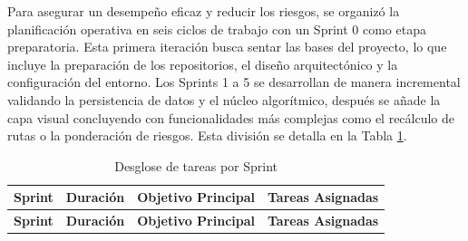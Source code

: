 Para asegurar un desempeño eficaz y reducir los riesgos, se organizó la planificación operativa en seis ciclos de trabajo con un Sprint 0 como etapa preparatoria. Esta primera iteración busca sentar las bases del proyecto, lo que incluye la preparación de los repositorios, el diseño arquitectónico y la configuración del entorno. Los Sprints 1 a 5 se desarrollan de manera incremental validando la persistencia de datos y el núcleo algorítmico, después se añade la capa visual concluyendo con funcionalidades más complejas como el recálculo de rutas o la ponderación de riesgos. Esta división se detalla en la Tabla \ref{tab:sprints}.

\renewcommand{\arraystretch}{1.5} 
\begin{longtable}{|c|c|p{5.5cm}|p{5.5cm}|}
\caption{Desglose de tareas por Sprint} \label{tab:sprints} \\
\hline
\textbf{Sprint} & \textbf{Duración} & \textbf{Objetivo Principal} & \textbf{Tareas Asignadas} \\
\hline
\endfirsthead

\hline
\textbf{Sprint} & \textbf{Duración} & \textbf{Objetivo Principal} & \textbf{Tareas Asignadas} \\
\hline
\endhead


\end{longtable}
